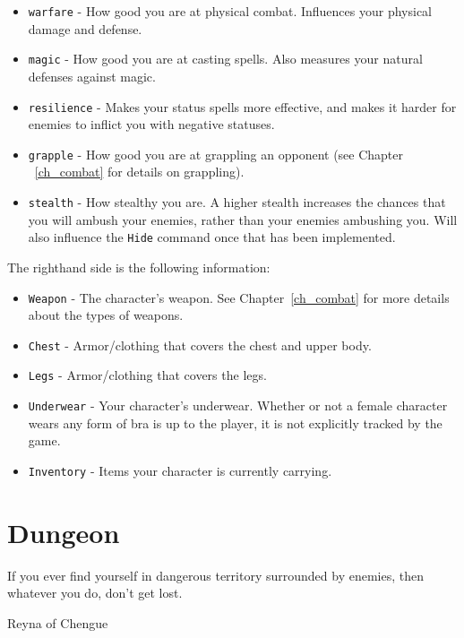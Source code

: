 \documentclass{report}
\begin{document}
\begin{itemize}
\begin{itemize}
            \begin{itemize}
                \item \verb|warfare| - How good you are at physical combat. Influences your
                physical damage and defense.
                \item \verb|magic| - How good you are at casting spells. Also measures your
                natural defenses against magic.
                \item \verb|resilience| - Makes your status spells more
                effective, and makes it harder for enemies to inflict you with negative 
                statuses.
                \item \verb|grapple| - How good you are at grappling an opponent (see Chapter
                ~\ref{ch_combat} for details on grappling).
                \item \verb|stealth| - How stealthy you are. A higher stealth increases the 
                chances that you will ambush your enemies, rather than your enemies ambushing
                you. Will also influence the \verb|Hide| command once that has been implemented.
            \end{itemize}
    \end{itemize}
\end{itemize}

    The righthand side is the following information:
\begin{itemize}
    \item \verb|Weapon| - The character's weapon. See Chapter~\ref{ch_combat} for
    more details about the types of weapons.
    \item \verb|Chest| - Armor/clothing that covers the chest and upper body.
    \item \verb|Legs| - Armor/clothing that covers the legs. 
    \item \verb|Underwear| - Your character's underwear. Whether or not a female
    character wears any form of bra is up to the player, it is not explicitly tracked
    by the game.
    \item \verb|Inventory| - Items your character is currently carrying.
\end{itemize}

\chapter{Dungeon}
\label{ch_dungeon}
\epigraph{If you ever find yourself in dangerous territory surrounded by enemies, 
then whatever you do, don't get lost.}{Reyna of Chengue}
\end{document}
